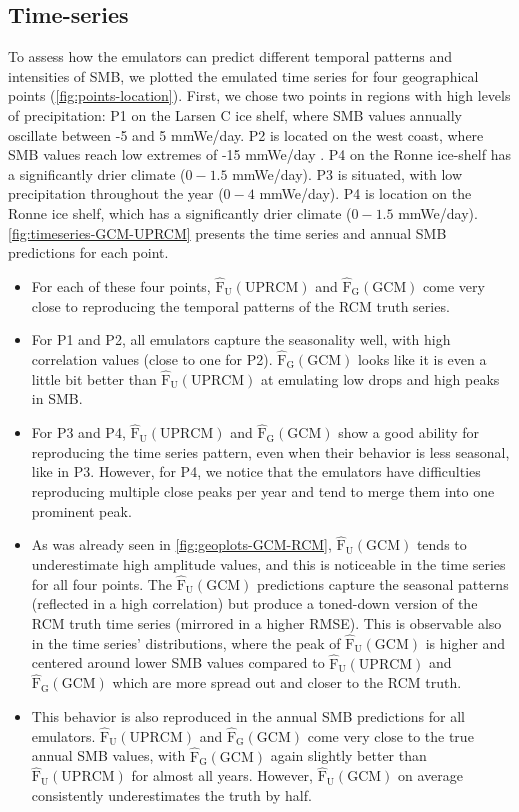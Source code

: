 \documentclass[a4paper,11pt,oneside]{report}
\begin{document}
\subsection{Time-series}\label{sec:res-time-series}
To assess how the emulators can predict different temporal patterns and intensities of SMB, we plotted the emulated time series for four geographical points (\autoref{fig:points-location}). First, we chose two points in regions with high levels of precipitation: P1 on the Larsen C ice shelf, where SMB values annually oscillate between -5 and 5 \si{mmWe/day}. P2 is located on the west coast, where SMB values reach low extremes of -15 \si{mmWe/day} . P4 on the Ronne ice-shelf has a significantly drier climate ($0-1.5$ \si{mmWe/day}). P3 is situated, with low precipitation throughout the year ($0-4$ \si{mmWe/day}). P4 is location on the Ronne ice shelf, which has a significantly drier climate ($0-1.5$ \si{mmWe/day}). \autoref{fig:timeseries-GCM-UPRCM} presents the time series and annual SMB predictions for each point. 
\begin{itemize}
    \item For each of these four points, $\mathrm{\hat{F}_{U}(UPRCM)}$ and $\mathrm{\hat{F}_{G}(GCM)}$ come very close to reproducing the temporal patterns of the RCM truth series. 
    \item For P1 and P2, all emulators capture the seasonality well, with high correlation values (close to one for P2). $\mathrm{\hat{F}_{G}(GCM)}$ looks like it is even a little bit better than $\mathrm{\hat{F}_{U}(UPRCM)}$ at emulating low drops and high peaks in SMB. 
    \item For P3 and P4, $\mathrm{\hat{F}_{U}(UPRCM)}$ and $\mathrm{\hat{F}_{G}(GCM)}$ show a good ability for reproducing the time series pattern, even when their behavior is less seasonal, like in P3. However, for P4, we notice that the emulators have difficulties reproducing multiple close peaks per year and tend to merge them into one prominent peak. 
    \item As was already seen in \autoref{fig:geoplots-GCM-RCM}, $\mathrm{\hat{F}_{U}(GCM)}$ tends to underestimate high amplitude values, and this is noticeable in the time series for all four points. The $\mathrm{\hat{F}_{U}(GCM)}$ predictions capture the seasonal patterns (reflected in a high correlation) but produce a toned-down version of the RCM truth time series (mirrored in a higher RMSE). This is observable also in the time series' distributions, where the peak of $\mathrm{\hat{F}_{U}(GCM)}$ is higher and centered around lower SMB values compared to $\mathrm{\hat{F}_{U}(UPRCM)}$ and $\mathrm{\hat{F}_{G}(GCM)}$ which are more spread out and closer to the RCM truth. 
    \item This behavior is also reproduced in the annual SMB predictions for all emulators. $\mathrm{\hat{F}_{U}(UPRCM)}$ and $\mathrm{\hat{F}_{G}(GCM)}$ come very close to the true annual SMB values, with $\mathrm{\hat{F}_{G}(GCM)}$ again slightly better than $\mathrm{\hat{F}_{U}(UPRCM)}$ for almost all years. However, $\mathrm{\hat{F}_{U}(GCM)}$ on average consistently underestimates the truth by half. 

\end{itemize}
\end{document}
